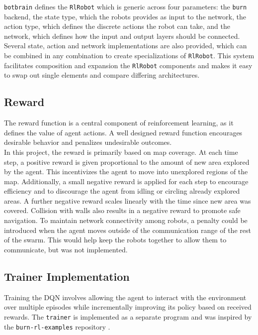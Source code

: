 \texttt{botbrain} defines the \texttt{RlRobot} which is generic across four parameters: the \texttt{burn} backend, the state type, which the robots provides as input to the network, the action type, which defines the discrete actions the robot can take, and the network, which defines how the input and output layers should be connected. Several state, action and network implementations are also provided, which can be combined in any combination to create specializations of \texttt{RlRobot}. This system facilitates composition and expansion the \texttt{RlRobot} components and makes it easy to swap out single elements and compare differing architectures.


\subsection{Reward}
The reward function is a central component of reinforcement learning, as it defines the value of agent actions. A well designed reward function encourages desirable behavior and penalizes undesirable outcomes. \\

In this project, the reward is primarily based on map coverage. At each time step, a positive reward is given proportional to the amount of new area explored by the agent. This incentivizes the agent to move into unexplored regions of the map. Additionally, a small negative reward is applied for each step to encourage efficiency and to discourage the agent from idling or circling already explored areas. A further negative reward scales linearly with the time since new area was covered. Collision with walls also results in a negative reward to promote safe navigation. To maintain network connectivity among robots, a penalty could be introduced when the agent moves outside of the communication range of the rest of the swarm. This would help keep the robots together to allow them to communicate, but was not implemented.

\subsection{Trainer Implementation}
Training the DQN involves allowing the agent to interact with the environment over multiple episodes while incrementally improving its policy based on received rewards. The \texttt{trainer} is implemented as a separate program and was inspired by the \texttt{burn-rl-examples} repository \cite{burn-rl-examples}. \\

